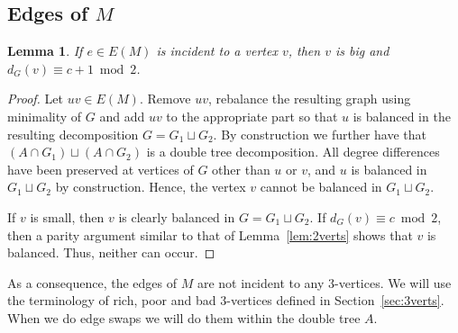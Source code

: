 \documentclass[11pt, reqno, a4paper]{article}
\newtheorem{lemma}{Lemma}[section]
\theoremstyle{definition}
\numberwithin{equation}{section}
\begin{document}
\subsection{Edges of \texorpdfstring{$M$}{M}}
\begin{lemma}\label{lem:Mparity} 
If $e\in E(M)$ is incident to a vertex $v$, then $v$ is big 
and $d_G(v) \equiv c+1\bmod{2}$.
\end{lemma}
\begin{proof}
Let $uv\in E(M)$.
Remove $uv$, rebalance the resulting graph using minimality of $G$ and add $uv$ to the appropriate part so that $u$ is balanced in the resulting decomposition $G=G_1\sqcup G_2$.
By construction we further have that $(A\cap G_1 ) \sqcup (A\cap G_2)$ is a double tree decomposition.
All degree differences have been preserved at vertices of $G$ other than $u$ or $v$, and $u$ is balanced in $G_1\sqcup G_2$ by construction. Hence, the vertex \(v\) cannot be balanced in \(G_1 \sqcup G_2\).

If $v$ is small, then $v$ is clearly balanced in $G=G_1\sqcup G_2$.
If $d_{G}(v) \equiv c \bmod{2}$, then a parity argument similar to that of Lemma~\ref{lem:2verts} shows that $v$ is balanced.
Thus, neither can occur.
\end{proof}
As a consequence, the edges of $M$ are not incident to any $3$-vertices.
We will use the terminology of rich, poor and bad \(3\)-vertices defined in Section~\ref{sec:3verts}. When we do edge swaps we will do them within the double tree \(A\).
\end{document}
